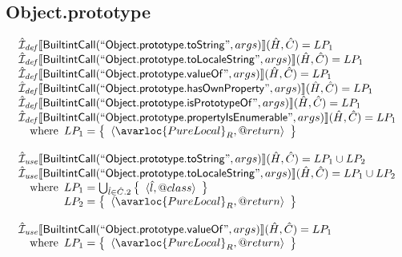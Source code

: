 \subsection{Object.prototype}
\[
\begin{array}{l}

\aI_{\it def}\lbr \SF{BuiltintCall}(``\SF{Object.prototype.toString}",args)\rbr(\hat{H},\hat{C}) = LP_1\\
\aI_{\it def}\lbr \SF{BuiltintCall}(``\SF{Object.prototype.toLocaleString}",args)\rbr(\hat{H},\hat{C}) = LP_1\\
\aI_{\it def}\lbr \SF{BuiltintCall}(``\SF{Object.prototype.valueOf}",args)\rbr(\hat{H},\hat{C}) = LP_1\\
\aI_{\it def}\lbr \SF{BuiltintCall}(``\SF{Object.prototype.hasOwnProperty}",args)\rbr(\hat{H},\hat{C}) = LP_1\\
\aI_{\it def}\lbr \SF{BuiltintCall}(``\SF{Object.prototype.isPrototypeOf}",args)\rbr(\hat{H},\hat{C}) = LP_1\\
\aI_{\it def}\lbr \SF{BuiltintCall}(``\SF{Object.prototype.propertyIsEnumerable}",args)\rbr(\hat{H},\hat{C}) = LP_1\\
\quad\wherec{
  LP_1 = \set{\langle\avarloc{PureLocal}_R,\varprop{return}\rangle}\\
  }\\
\\


\aI_{\it use}\lbr \SF{BuiltintCall}(``\SF{Object.prototype.toString}",args)\rbr(\hat{H},\hat{C}) = LP_1 \cup LP_2\\
\aI_{\it use}\lbr \SF{BuiltintCall}(``\SF{Object.prototype.toLocaleString}",args)\rbr(\hat{H},\hat{C}) = LP_1 \cup LP_2\\
\quad\wherec{
  LP_1 = \bigcup_{\hat{l} \in \hat{C}.2} \set{\langle \hat{l},\varprop{class} \rangle}\\
  LP_2 = \set{\langle\avarloc{PureLocal}_R,\varprop{return}\rangle}\\
  }\\
\\


\aI_{\it use}\lbr \SF{BuiltintCall}(``\SF{Object.prototype.valueOf}",args)\rbr(\hat{H},\hat{C}) = LP_1\\
\quad\wherec{
  LP_1 = \set{\langle\avarloc{PureLocal}_R,\varprop{return}\rangle}\\
  }\\
\\



\end{array}\]
